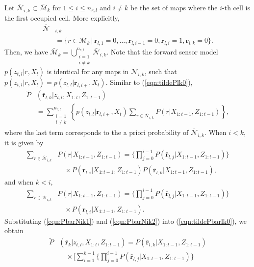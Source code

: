 \documentclass[letterpaper, 10pt, conference]{ieeeconf}
\newcommand{\braces}[1]{\ensuremath{\left\{ #1 \right\}}}
\newcommand{\refeqn}[1]{(\ref{eqn:#1})}
\begin{document}
\begin{appendix}
Let $\bar{\mathcal{N}}_{i,k}\subset \bar{\mathcal{M}}_k $ for $1\leq i\leq n_{r,l}$ and $i\neq k$ be the set of maps where the $i$-th cell is the first occupied cell. More explicitly, 
\begin{align*}
\bar{\mathcal{N}}&_{i,k}\nonumber\\&=\{r\in\bar{\mathcal{M}}_k\,|\, \mathbf{r}_{l,1}=0,\ldots,\mathbf{r}_{l,i-1}=0,
\mathbf{r}_{l,i}=1,\mathbf{r}_{l,k}=0\}.
\end{align*}
Then, we have $\bar{\mathcal{M}}_k=\bigcup_{\substack{i=1\\i\neq k}}^{n_{r,l}} \bar{\mathcal{N}}_{i,k}$. Note that the forward sensor model $p(z_{t,l}|r,X_t)$ is identical for any maps in $\bar{\mathcal{N}}_{i,k}$, such that $p(z_{t,l}|r,X_t)=p(z_{t,l}|\mathbf{r}_{l,i+},X_t)$. Similar to \refeqn{tildePlk0},
\begin{align}
\tilde P&(\bar{\mathbf{r}}_{l,k}|z_{t,l},X_{1:t},Z_{1:t-1})\nonumber\\
& = \sum_{\substack{i=1\\i\neq k}}^{n_{r,l}} \braces{p(z_{t,l}|\mathbf{r}_{l,i+},X_t) \sum_{r\in\bar{\mathcal{N}}_{i,k}} P(r|X_{1:t-1},Z_{1:t-1})},\label{eqn:tildePbarlk0}
\end{align}
where the last term corresponds to the a priori probability of $\bar{\mathcal{N}}_{i,k}$. When $i<k$, it is given by
\begin{align}
\sum_{r\in\bar{\mathcal{N}}_{i,k}} & P(r|X_{1:t-1},Z_{1:t-1}) = \bigg\{\prod_{j=0}^{i-1}P(\bar{\mathbf{r}}_{l,j}|X_{1:t-1},Z_{1:t-1})\bigg\}\nonumber\\
&\quad \times P({\mathbf{r}}_{l,i}|X_{1:t-1},Z_{1:t-1})P(\bar{\mathbf{r}}_{l,k}|X_{1:t-1},Z_{1:t-1}),\label{eqn:PbarNik1}
\end{align}
and when $k<i$,
\begin{align}
\sum_{r\in\bar{\mathcal{N}}_{i,k}} & P(r|X_{1:t-1},Z_{1:t-1}) = \bigg\{\prod_{j=0}^{i-1}P(\bar{\mathbf{r}}_{l,j}|X_{1:t-1},Z_{1:t-1})\bigg\}\nonumber\\
&\quad \times P({\mathbf{r}}_{l,i}|X_{1:t-1},Z_{1:t-1}).\label{eqn:PbarNik2}
\end{align}
Substituting \refeqn{PbarNik1} and \refeqn{PbarNik2} into \refeqn{tildePbarlk0}, we obtain
\begin{align}
\tilde P &(\bar{\mathbf{r}}_k|z_{t,l},X_{1:t},Z_{1:t-1})
=P(\bar{\mathbf{r}}_{l,k}|X_{1:t-1},Z_{1:t-1})\nonumber\\
&\quad\times \bigg[\sum_{i=1}^{k-1}\bigg\{\prod_{j=0}^{i-1}P(\bar{\mathbf{r}}_{l,j}|X_{1:t-1},Z_{1:t-1})\bigg\}\nonumber\\

\end{align}
\end{appendix}
\end{document}
